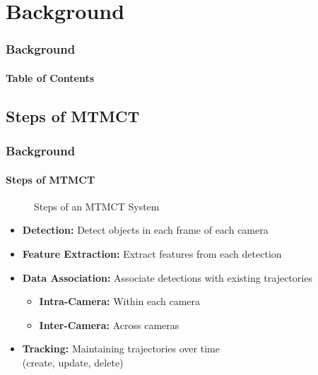 \section{Background}
\begin{frame}
	\frametitle{Background}
	\framesubtitle{Table of Contents}
	{
		\hypersetup{hidelinks}
	}
\end{frame}

\subsection{Steps of MTMCT}
\begin{frame}
	\frametitle{Background}
	\framesubtitle{Steps of MTMCT}

	\begin{figure}[ht]
		\centering
		
		\caption{Steps of an MTMCT System}\label{fig:mtmct_steps}
	\end{figure}

	\begin{itemize}
		\item <2->\textbf{Detection:} Detect objects in each frame of each camera
		      \vspace{5pt}
		\item <3->\textbf{Feature Extraction:} Extract features from each detection
		      \vspace{5pt}
		\item <4->\textbf{Data Association:} Associate detections with existing trajectories
		      \begin{itemize}
			      \item \textbf{Intra-Camera:} Within each camera
			      \item \textbf{Inter-Camera:} Across cameras
		      \end{itemize}
		      \vspace{5pt}
		\item <5->\textbf{Tracking:} Maintaining trajectories over time\\(create, update, delete)
	\end{itemize}
\end{frame}


